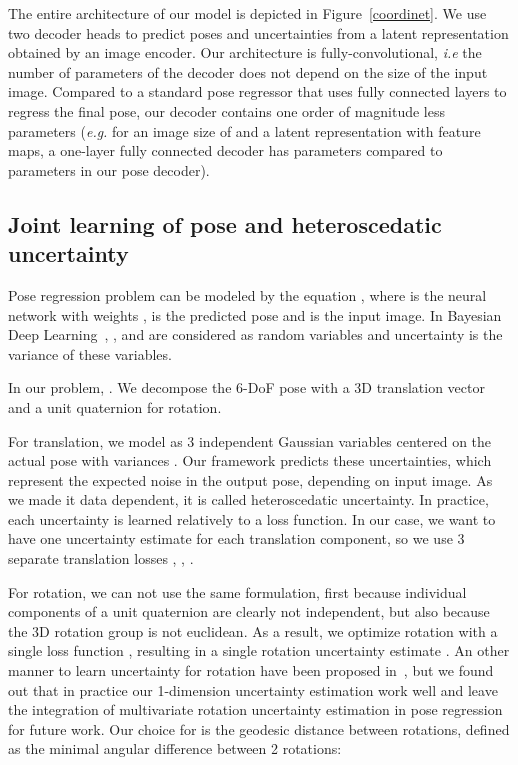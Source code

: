 \documentclass[10pt,twocolumn,letterpaper]{article}
\begin{document}
The entire architecture of our model is depicted in Figure~\ref{coordinet}. We use two decoder heads to predict poses and uncertainties from a latent representation obtained by an image encoder. Our architecture is fully-convolutional, \textit{i.e} the number of parameters of the decoder does not depend on the size of the input image. Compared to a standard pose regressor that uses fully connected layers to regress the final pose, our decoder contains one order of magnitude less parameters (\textit{e.g.} for an image size of  and a latent representation with  feature maps, a one-layer fully connected decoder has  parameters compared to  parameters in our pose decoder).



\subsection{Joint learning of pose and heteroscedatic uncertainty}
\label{jointlearning}

Pose regression problem can be modeled by the equation
,
where  is the neural network with weights ,  is the predicted pose and  is the input image. In Bayesian Deep Learning~\cite{whatuncertainties}, ,  and  are considered as random variables and uncertainty is the variance of these variables.

In our problem, . We decompose the 6-DoF pose with a 3D translation vector  and a unit quaternion  for rotation.

For translation, we model  as 3 independent Gaussian variables centered on the actual pose with variances . Our framework predicts these  uncertainties, which represent the expected noise in the output pose, depending on input image. As we made it data dependent, it is called heteroscedatic uncertainty. In practice, each uncertainty is learned relatively to a loss function. In our case, we want to have one uncertainty estimate for each translation component, so we use 3 separate  translation losses , , .

For rotation, we can not use the same formulation, first because individual components of a unit quaternion are clearly not independent, but also because the 3D rotation group  is not euclidean. As a result, we optimize rotation with a single loss function , resulting in a single rotation uncertainty estimate . An other manner to learn uncertainty for rotation have been proposed in~\cite{peretroukhin2019probabilistic}, but we found out that in practice our 1-dimension uncertainty estimation work well and leave the integration of multivariate rotation uncertainty estimation in pose regression for future work. Our choice for  is the geodesic distance between rotations, defined as the minimal angular difference between 2 rotations:
\end{document}
